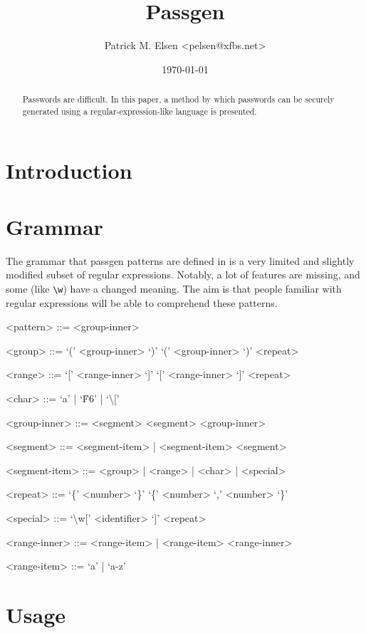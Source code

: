 \documentclass[a4paper]{article}
\title{Passgen}
\author{Patrick M. Elsen <pelsen@xfbs.net>}
\date{\today}
\begin{document}
\maketitle
\begin{abstract}
  Passwords are difficult. In this paper, a method by which passwords can be securely generated using a regular-expression-like language is presented.
\end{abstract}

\tableofcontents

\section{Introduction}



\section{Grammar}

The grammar that passgen patterns are defined in is a very limited and slightly modified subset of regular expressions. Notably, a lot of features are missing, and some (like \verb|\w|) have a changed meaning. The aim is that people familiar with regular expressions will be able to comprehend these patterns.

\setlength{\grammarindent}{4em}
\begin{grammar}

<pattern> ::= <group-inner>

<group> ::= ‘(’ <group-inner> ‘)’ \alt ‘(’ <group-inner> ‘)’ <repeat>

<range> ::= ‘[’ <range-inner> ‘]’ \alt ‘[’ <range-inner> ‘]’ <repeat>

<char> ::= ‘a’ | ‘\u{F6}’ | ‘\textbackslash [’

<group-inner> ::= <segment> \alt <segment> <group-inner>

<segment> ::= <segment-item> | <segment-item> <segment>

<segment-item> ::= <group> | <range> | <char> | <special>

<repeat> ::= ‘\{’ <number> ‘\}’ \alt ‘\{’ <number> ‘,’ <number> ‘\}’

<special> ::= ‘\textbackslash w[’ <identifier> ‘]’ <repeat>

<range-inner> ::= <range-item> | <range-item> <range-inner>

<range-item> ::= ‘a’ | ‘a-z’

\end{grammar}

\section{Usage}
\end{document}

